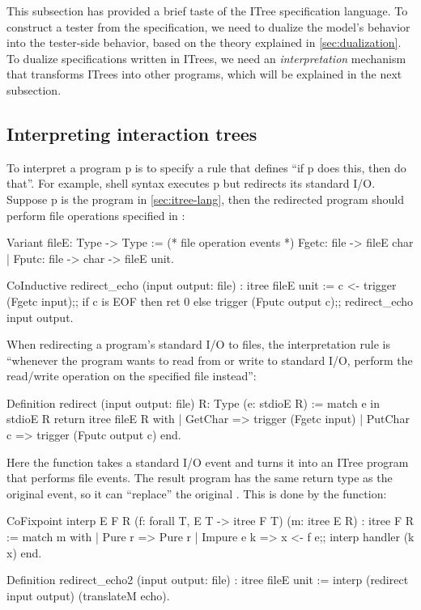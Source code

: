 This subsection has provided a brief taste of the ITree specification language.
To construct a tester from the specification, we need to dualize the model's
behavior into the tester-side behavior, based on the theory explained in
\autoref{sec:dualization}.  To dualize specifications written in ITrees, we need
an {\em interpretation} mechanism that transforms ITrees into other programs,
which will be explained in the next subsection.

\subsection{Interpreting interaction trees}
To interpret a program \ilc p is to specify a rule that defines ``if \ilc p does
this, then do that''.  For example, shell syntax 
executes \inlinec p but redirects its standard I/O.  Suppose \inlinec p is the
 program in \autoref{sec:itree-lang}, then the redirected program
should perform file operations specified in :
\begin{coq}
  Variant fileE: Type -> Type :=      (* file operation events *)
    Fgetc: file ->         fileE char
  | Fputc: file -> char -> fileE unit.

  CoInductive redirect_echo (input output: file) : itree fileE unit :=
    c <- trigger (Fgetc input);;
    if c is EOF then ret 0
    else trigger (Fputc output c);;
         redirect_echo input output.
\end{coq}

When redirecting a program's standard I/O to files, the interpretation rule is
``whenever the program wants to read from or write to standard I/O, perform the
read/write operation on the specified file instead'':
\begin{coq}
  Definition redirect (input output: file) {R: Type} (e: stdioE R) :=
    match e in stdioE R return itree fileE R with
    | GetChar   => trigger (Fgetc input)
    | PutChar c => trigger (Fputc output c)
    end.
\end{coq}

Here the  function takes a standard I/O event and turns it into an
ITree program that performs file events.  The result program has the same return
type as the original event, so it can ``replace'' the original .
This is done by the  function:
\begin{coq}
  CoFixpoint interp {E F R} (f: forall {T}, E T -> itree F T) (m: itree E R)
             : itree F R :=
    match m with
    | Pure   r   => Pure r
    | Impure e k => x <- f e;;
                    interp handler (k x)
    end.

  Definition redirect_echo2 (input output: file) : itree fileE unit :=
    interp (redirect input output) (translateM echo).
\end{coq}

